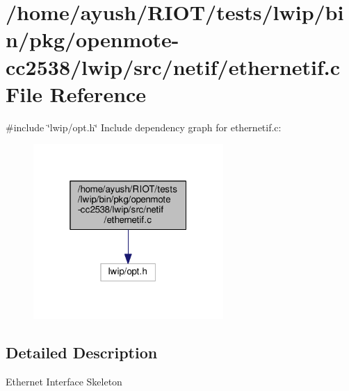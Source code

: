 \hypertarget{openmote-cc2538_2lwip_2src_2netif_2ethernetif_8c}{}\section{/home/ayush/\+R\+I\+O\+T/tests/lwip/bin/pkg/openmote-\/cc2538/lwip/src/netif/ethernetif.c File Reference}
\label{openmote-cc2538_2lwip_2src_2netif_2ethernetif_8c}
{\ttfamily \#include \char`\"{}lwip/opt.\+h\char`\"{}}\newline
Include dependency graph for ethernetif.\+c\+:
\nopagebreak
\begin{figure}[H]
\begin{center}
\leavevmode
\includegraphics[width=205pt]{openmote-cc2538_2lwip_2src_2netif_2ethernetif_8c__incl}
\end{center}
\end{figure}


\subsection{Detailed Description}
Ethernet Interface Skeleton 